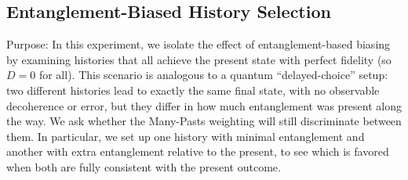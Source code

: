 \documentclass[11pt]{article}
\begin{document}
\subsection*{Entanglement-Biased History Selection} %

Purpose: In this experiment, we isolate the effect of entanglement-based biasing by examining histories that all achieve the present state with perfect fidelity (so $D=0$ for all). This scenario is analogous to a quantum “delayed-choice” setup: two different histories lead to exactly the same final state, with no observable decoherence or error, but they differ in how much entanglement was present along the way. We ask whether the Many-Pasts weighting will still discriminate between them. In particular, we set up one history with minimal entanglement and another with extra entanglement relative to the present, to see which is favored when both are fully consistent with the present outcome.
\end{document}
